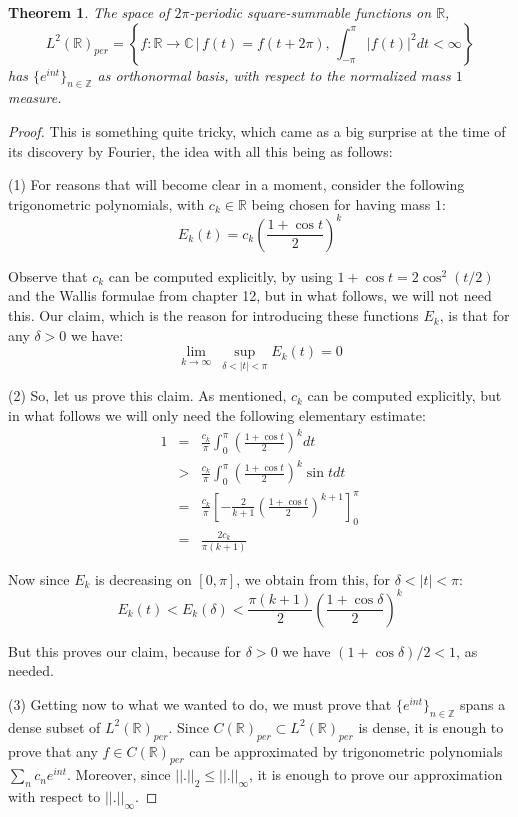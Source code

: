 \documentclass[12pt]{amsbook}
\newtheorem{theorem}{Theorem}[chapter]
\begin{document}
\begin{theorem}
The space of $2\pi$-periodic square-summable functions on $\mathbb R$,
$$L^2(\mathbb R)_{per}=\left\{f:\mathbb R\to\mathbb C\,\Big|\,f(t)=f(t+2\pi),\,\int_{-\pi}^\pi|f(t)|^2dt<\infty\right\}$$
has $\{e^{int}\}_{n\in\mathbb Z}$ as orthonormal basis, with respect to the normalized mass $1$ measure.
\end{theorem}

\begin{proof}
This is something quite tricky, which came as a big surprise at the time of its discovery by Fourier, the idea with all this being as follows:

\medskip

(1) For reasons that will become clear in a moment, consider the following trigonometric polynomials, with $c_k\in\mathbb R$ being chosen for having mass $1$:
$$E_k(t)=c_k\left(\frac{1+\cos t}{2}\right)^k$$

Observe that $c_k$ can be computed explicitly, by using $1+\cos t=2\cos^2(t/2)$ and the Wallis formulae from chapter 12, but in what follows, we will not need this. Our claim, which is the reason for introducing these functions $E_k$, is that for any $\delta>0$ we have:
$$\lim_{k\to\infty}\ \sup_{\delta<|t|<\pi}E_k(t)=0$$

(2) So, let us prove this claim. As mentioned, $c_k$ can be computed explicitly, but in what follows we will only need the following elementary estimate:
\begin{eqnarray*}
1
&=&\frac{c_k}{\pi}\int_0^\pi\left(\frac{1+\cos t}{2}\right)^kdt\\
&>&\frac{c_k}{\pi}\int_0^\pi\left(\frac{1+\cos t}{2}\right)^k\sin tdt\\
&=&\frac{c_k}{\pi}\left[-\frac{2}{k+1}\left(\frac{1+\cos t}{2}\right)^{k+1}\right]_0^\pi\\
&=&\frac{2c_k}{\pi(k+1)}
\end{eqnarray*}

Now since $E_k$ is decreasing on $[0,\pi]$, we obtain from this, for $\delta<|t|<\pi$:
$$E_k(t)<E_k(\delta)<\frac{\pi(k+1)}{2}\left(\frac{1+\cos\delta}{2}\right)^k$$

But this proves our claim, because for $\delta>0$ we have $(1+\cos\delta)/2<1$, as needed.

\medskip

(3) Getting now to what we wanted to do, we must prove that $\{e^{int}\}_{n\in\mathbb Z}$ spans a dense subset of $L^2(\mathbb R)_{per}$. Since $C(\mathbb R)_{per}\subset L^2(\mathbb R)_{per}$ is dense, it is enough to prove that any $f\in C(\mathbb R)_{per}$ can be approximated by trigonometric polynomials $\sum_nc_ne^{int}$. Moreover, since $||.||_2\leq||.||_\infty$, it is enough to prove our approximation with respect to $||.||_\infty$.


\end{proof}
\end{document}
